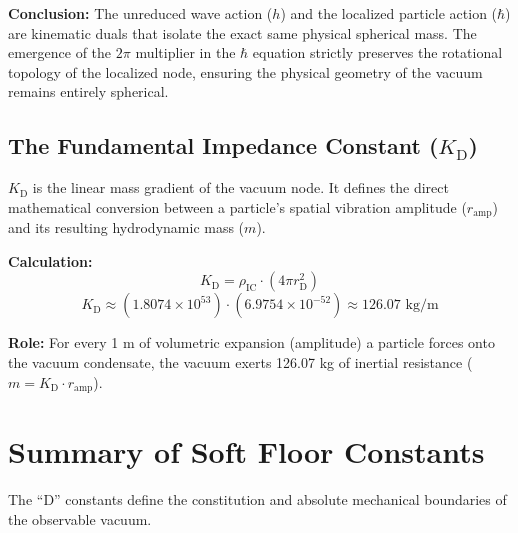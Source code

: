 \noindent\textbf{Conclusion:} The unreduced wave action ($h$) and the localized particle action ($\hbar$) are kinematic duals that isolate the exact same physical spherical mass. The emergence of the $2\pi$ multiplier in the $\hbar$ equation strictly preserves the rotational topology of the localized node, ensuring the physical geometry of the vacuum remains entirely spherical.

\subsection{The Fundamental Impedance Constant ($K_{\mathrm{D}}$)}
$K_{\mathrm{D}}$ is the linear mass gradient of the vacuum node. It defines the direct mathematical conversion between a particle's spatial vibration amplitude ($r_{\mathrm{amp}}$) and its resulting hydrodynamic mass ($m$).

\noindent\textbf{Calculation:}
\begin{equation}
    K_{\mathrm{D}} = \rho_{\mathrm{IC}} \cdot (4\pi r_{\mathrm{D}}^2)
\end{equation}
\begin{equation}
    K_{\mathrm{D}} \approx (1.8074 \times 10^{53}) \cdot (6.9754 \times 10^{-52}) \approx 126.07 \text{ kg/m}
\end{equation}

\noindent\textbf{Role:} For every 1 m of volumetric expansion (amplitude) a particle forces onto the vacuum condensate, the vacuum exerts 126.07 kg of inertial resistance ($m = K_{\mathrm{D}} \cdot r_{\mathrm{amp}}$).

\section{Summary of Soft Floor Constants}
The ``D'' constants define the constitution and absolute mechanical boundaries of the observable vacuum.

